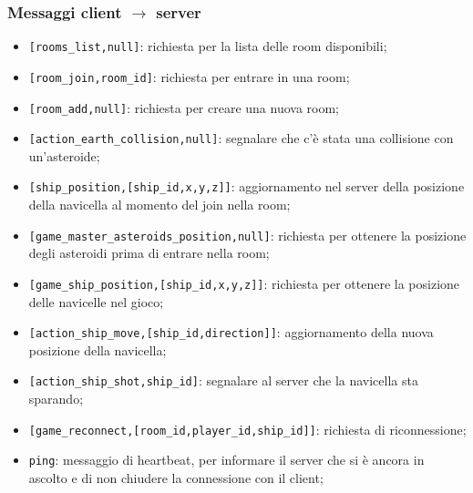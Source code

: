 \documentclass[paper=a4, fontsize=11pt]{scrartcl} %
\numberwithin{equation}{section} %
\numberwithin{figure}{section} %
\numberwithin{table}{section} %
\begin{document}
\subsubsection{Messaggi client $\rightarrow$ server}
\begin{itemize}
\item \texttt{[rooms\_list,null]}: richiesta per la lista delle room disponibili;
\item \texttt{[room\_join,room\_id]}: richiesta per entrare in una room;
\item \texttt{[room\_add,null]}: richiesta per creare una nuova room;
\item \texttt{[action\_earth\_collision,null]}: segnalare che c'è stata una collisione con un'asteroide;
\item \texttt{[ship\_position,[ship\_id,x,y,z]]}: aggiornamento nel server della posizione della navicella al momento del join nella room;
\item \texttt{[game\_master\_asteroids\_position,null]}: richiesta per ottenere la posizione degli asteroidi prima di entrare nella room;
\item \texttt{[game\_ship\_position,[ship\_id,x,y,z]]}: richiesta per ottenere la posizione delle navicelle nel gioco;
\item \texttt{[action\_ship\_move,[ship\_id,direction]]}: aggiornamento della nuova posizione della navicella;
\item \texttt{[action\_ship\_shot,ship\_id]}: segnalare al server che la navicella sta sparando;
\item \texttt{[game\_reconnect,[room\_id,player\_id,ship\_id]]}: richiesta di riconnessione;
\item \texttt{ping}: messaggio di heartbeat, per informare il server che si è ancora in ascolto e di non chiudere la connessione con il client;
\end{itemize}
\end{document}
